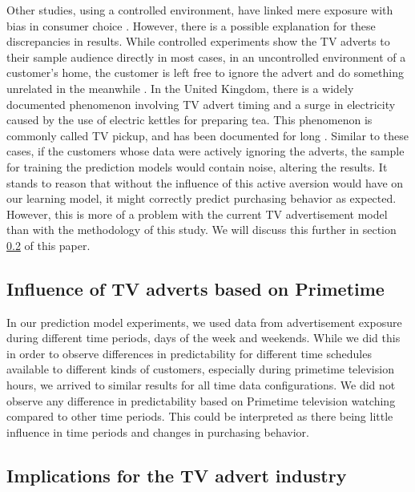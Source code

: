 \documentclass[review]{elsarticle}
\begin{document}
Other studies, using a controlled environment, have linked mere exposure with bias in consumer choice \cite{janiszewski}. However, there is a possible explanation for these discrepancies in results. While controlled experiments show the TV adverts to their sample audience directly in most cases, in an uncontrolled environment of a customer's home, the customer is left free to ignore the advert and do something unrelated in the meanwhile \cite{abernethy}. In the United Kingdom, there is a widely documented phenomenon involving TV advert timing and a surge in electricity caused by the use of electric kettles for preparing tea. This phenomenon is commonly called TV pickup, and has been documented for long \cite{bunn,boait}. Similar to these cases, if the customers whose data were actively ignoring the adverts, the sample for training the prediction models would contain noise, altering the results. It stands to reason that without the influence of this active aversion would have on our learning model, it might correctly predict purchasing behavior as expected. However, this is more of a problem with the current TV advertisement model than with the methodology of this study. We will discuss this further in section \ref{disc_advert} of this paper.


\subsection{Influence of TV adverts based on Primetime}
\label{disc_prime}

In our prediction model experiments, we used data from advertisement exposure during different time periods, days of the week and weekends. While we did this in order to observe differences in predictability for different time schedules available to different kinds of customers, especially during primetime television hours, we arrived to similar results for all time data configurations. We did not observe any difference in predictability based on Primetime television watching compared to other time periods. This could be interpreted as there being little influence in time periods and changes in purchasing behavior. 

\subsection{Implications for the TV advert industry}
\label{disc_advert}
\end{document}
